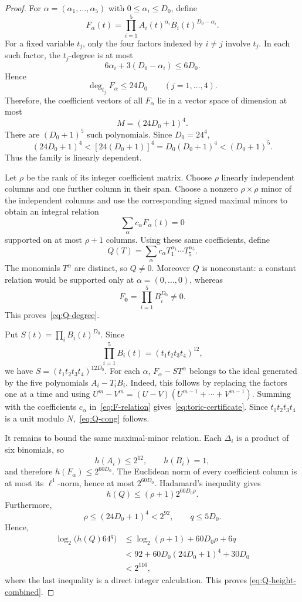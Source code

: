 \documentclass[11pt]{amsart}
\theoremstyle{remark}
\begin{document}
\begin{proof}
For $\alpha=(\alpha_1,\ldots,\alpha_5)$ with
$0\le\alpha_i\le D_0$, define
\[
 F_\alpha(t)=\prod_{i=1}^5A_i(t)^{\alpha_i}B_i(t)^{D_0-\alpha_i}.
\]
For a fixed variable $t_j$, only the four factors indexed by $i\ne j$
involve $t_j$. In each such factor, the $t_j$-degree is at most
\[
 6\alpha_i+3(D_0-\alpha_i)\le6D_0.
\]
Hence
\[
 \deg_{t_j}F_\alpha\le24D_0\qquad(j=1,\ldots,4).
\]
Therefore, the coefficient vectors of all $F_\alpha$ lie in a vector space of
dimension at most
\[
 M=(24D_0+1)^4.
\]
There are $(D_0+1)^5$ such polynomials. Since $D_0=24^4$,
\[
 (24D_0+1)^4<[24(D_0+1)]^4
 =D_0(D_0+1)^4<(D_0+1)^5.
\]
Thus the family is linearly dependent.

Let $\rho$ be the rank of its integer coefficient matrix. Choose $\rho$
linearly independent columns and one further column in their span. Choose a
nonzero $\rho\times\rho$ minor of the independent columns and use the
corresponding signed maximal minors to obtain an integral relation
\begin{equation}\label{eq:F-relation}
 \sum_\alpha c_\alpha F_\alpha(t)=0
\end{equation}
supported on at most $\rho+1$ columns. Using these same coefficients, define
\[
 Q(T)=\sum_\alpha c_\alpha T_1^{\alpha_1}\cdots T_5^{\alpha_5}.
\]
The monomials $T^\alpha$ are distinct, so $Q\ne0$. Moreover $Q$ is
nonconstant: a constant relation would be supported only at
$\alpha=(0,\ldots,0)$, whereas
\[
 F_{\mathbf0}=\prod_{i=1}^5B_i^{D_0}\ne0.
\]
This proves~\eqref{eq:Q-degree}.

Put $S(t)=\prod_iB_i(t)^{D_0}$. Since
\[
 \prod_{i=1}^5B_i(t)=(t_1t_2t_3t_4)^{12},
\]
we have $S=(t_1t_2t_3t_4)^{12D_0}$. For each $\alpha$,
$F_\alpha-ST^\alpha$ belongs to the ideal generated by the five polynomials
$A_i-T_iB_i$. Indeed, this follows by replacing the factors one at a time and
using $U^m-V^m=(U-V)(U^{m-1}+\cdots+V^{m-1})$. Summing with the coefficients
$c_\alpha$ in~\eqref{eq:F-relation} gives~\eqref{eq:toric-certificate}.
Since $t_1t_2t_3t_4$ is a unit modulo $N$,~\eqref{eq:Q-cong} follows.

It remains to bound the same maximal-minor relation. Each $\Delta_i$ is a
product of six binomials, so
\[
 h(A_i)\le2^{12},\qquad h(B_i)=1,
\]
and therefore $h(F_\alpha)\le2^{60D_0}$. The Euclidean norm of every
coefficient column is at most its $\ell^1$-norm, hence at most $2^{60D_0}$.
Hadamard's inequality gives
\[
 h(Q)\le(\rho+1)2^{60D_0\rho}.
\]
Furthermore,
\[
 \rho\le(24D_0+1)^4<2^{92},\qquad q\le5D_0.
\]
Hence,
\[
 \begin{split}
 \log_2 \bigl(h(Q)64^q\bigr)
 &\le \log_2(\rho+1)+60D_0\rho+6q\\
 &<92+60D_0(24D_0+1)^4+30D_0\\
 &<2^{116},
 \end{split}
\]
where the last inequality is a direct integer calculation. This proves
\eqref{eq:Q-height-combined}.
\end{proof}
\end{document}
